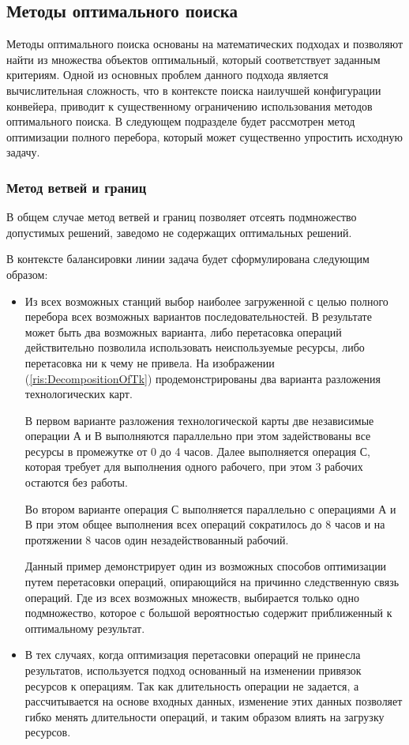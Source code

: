 \subsection{Методы оптимального поиска}
Методы оптимального поиска основаны на математических подходах и позволяют найти из множества объектов оптимальный, который соответствует заданным критериям. Одной из основных проблем данного подхода является вычислительная сложность, что в контексте поиска наилучшей конфигурации конвейера, приводит к существенному ограничению использования методов оптимального поиска. В следующем подразделе будет рассмотрен метод оптимизации полного перебора, который может существенно упростить исходную задачу.

\subsubsection{Метод ветвей и границ}
В общем случае метод ветвей и границ позволяет отсеять подмножество допустимых решений, заведомо не содержащих оптимальных решений.

В контексте балансировки линии задача будет сформулирована следующим образом:

\begin{itemize}
    \item Из всех возможных станций выбор наиболее загруженной с целью полного перебора всех возможных вариантов последовательностей. В результате может быть два возможных варианта, либо перетасовка операций действительно позволила использовать неиспользуемые ресурсы, либо перетасовка ни к чему не привела. На изображении (\ref{ris:DecompositionOfTk}) продемонстрированы два варианта разложения технологических карт. 
    
    В первом варианте разложения технологической карты две независимые операции А и В выполняются параллельно при этом задействованы все ресурсы в промежутке от 0 до 4 часов. Далее выполняется операция С, которая требует для выполнения одного рабочего, при этом 3 рабочих остаются без работы.
    
    Во втором варианте операция С выполняется параллельно с операциями А и В при этом общее выполнения всех операций сократилось до 8 часов и на протяжении 8 часов один незадействованный рабочий.
    
    Данный пример демонстрирует один из возможных способов оптимизации путем перетасовки операций, опирающийся на причинно следственную связь операций.  Где из всех возможных множеств, выбирается только одно подмножество, которое с большой вероятностью содержит приближенный к оптимальному результат.
    
    \item В тех случаях, когда оптимизация перетасовки операций не принесла результатов, используется подход основанный на изменении привязок ресурсов к операциям. Так как длительность операции не задается, а рассчитывается на основе входных данных, изменение этих данных позволяет гибко менять длительности операций, и таким образом влиять на загрузку ресурсов. 

\end{itemize}

